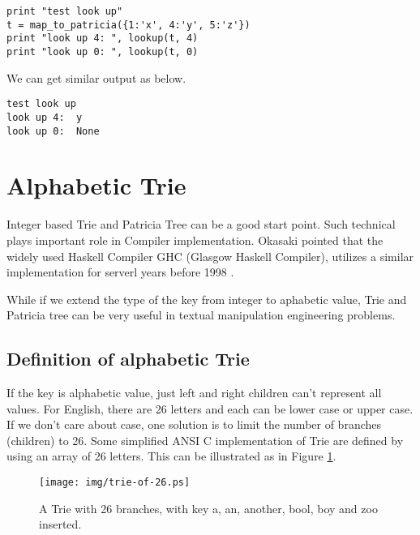 \documentclass{article}
\begin{document}
\begin{lstlisting}
print "test look up"
t = map_to_patricia({1:'x', 4:'y', 5:'z'})
print "look up 4: ", lookup(t, 4)
print "look up 0: ", lookup(t, 0)
\end{lstlisting}

We can get similar output as below.

\begin{verbatim}
test look up
look up 4:  y
look up 0:  None
\end{verbatim}

\section{Alphabetic Trie}
Integer based Trie and Patricia Tree can be a good start point. Such
technical plays important role in Compiler implementation. Okasaki
pointed that the widely used Haskell Compiler GHC (Glasgow Haskell 
Compiler), utilizes a similar implementation for serverl years before
1998 \cite{okasaki-int-map}. 

While if we extend the type of the key from integer to aphabetic
value, Trie and Patricia tree can be very useful in textual manipulation
engineering problems.

\subsection{Definition of alphabetic Trie}
If the key is alphabetic value, just left and right children can't
represent all values. For English, there are 26 letters and each can
be lower case or upper case. If we don't care about case, one solution
is to limit the number of branches (children) to 26. Some simplified
ANSI C implementation of Trie are defined by using an array of 26
letters. This can be illustrated as in Figure \ref{fig:trie-of-26}.

\begin{figure}[htbp]
  \begin{center}
    \texttt{[image: img/trie-of-26.ps]}
      \caption{A Trie with 26 branches, with key a, an, another, bool,
    boy and zoo inserted.}
      \label{fig:trie-of-26}
  \end{center}
\end{figure}
\end{document}
